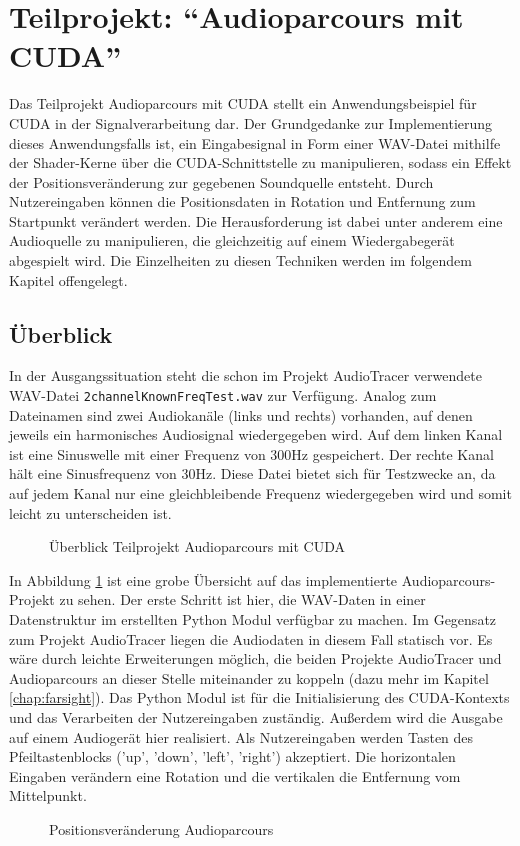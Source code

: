 
\section{Teilprojekt: \enquote{Audioparcours mit CUDA}} \label{CUDA_PARKOUR}

Das Teilprojekt Audioparcours mit CUDA stellt ein Anwendungsbeispiel für CUDA in der Signalverarbeitung dar. Der Grundgedanke zur Implementierung dieses Anwendungsfalls ist, ein Eingabesignal in Form einer WAV-Datei mithilfe der Shader-Kerne über die CUDA-Schnittstelle zu manipulieren, sodass ein Effekt der Positionsveränderung zur gegebenen Soundquelle entsteht. Durch Nutzereingaben können die Positionsdaten in Rotation und Entfernung zum Startpunkt verändert werden. Die Herausforderung ist dabei unter anderem eine Audioquelle zu manipulieren, die gleichzeitig auf einem Wiedergabegerät abgespielt wird. Die Einzelheiten zu diesen Techniken werden im folgendem Kapitel offengelegt.

\subsection{Überblick} \label{sub:manipulator_ov}
In der Ausgangssituation steht die schon im Projekt AudioTracer verwendete WAV-Datei \texttt{2channelKnownFreqTest.wav} zur Verfügung. Analog zum Dateinamen sind zwei Audiokanäle (links und rechts) vorhanden, auf denen jeweils ein harmonisches Audiosignal wiedergegeben wird. Auf dem linken Kanal ist eine Sinuswelle mit einer Frequenz von 300Hz gespeichert. Der rechte Kanal hält eine Sinusfrequenz von 30Hz. Diese Datei bietet sich für Testzwecke an, da auf jedem Kanal nur eine gleichbleibende Frequenz wiedergegeben wird und somit leicht zu unterscheiden ist. 
\begin{figure}[h!]
	\centering      
	\def\svgscale{0.75}
	
	\caption{Überblick Teilprojekt Audioparcours mit CUDA}
	\label{fig:manipulatorOV}
\end{figure}

In Abbildung \ref{fig:manipulatorOV} ist eine grobe Übersicht auf das implementierte Audioparcours-Projekt zu sehen. Der erste Schritt ist hier, die WAV-Daten in einer Datenstruktur im erstellten Python Modul verfügbar zu machen. Im Gegensatz zum Projekt AudioTracer liegen die Audiodaten in diesem Fall statisch vor. Es wäre durch leichte Erweiterungen möglich, die beiden Projekte AudioTracer und Audioparcours an dieser Stelle miteinander zu koppeln (dazu mehr im Kapitel \ref{chap:farsight}). Das Python Modul ist für die Initialisierung des CUDA-Kontexts und das Verarbeiten der Nutzereingaben zuständig. Außerdem wird die Ausgabe auf einem Audiogerät hier realisiert. Als Nutzereingaben werden Tasten des Pfeiltastenblocks ('up', 'down', 'left', 'right') akzeptiert. Die horizontalen Eingaben verändern eine Rotation und die vertikalen die Entfernung vom Mittelpunkt. 
\begin{figure}[h!]
	\centering      
	\def\svgscale{0.5}
	
	\caption{Positionsveränderung Audioparcours}
	\label{fig:audioparkourClock}
\end{figure}

